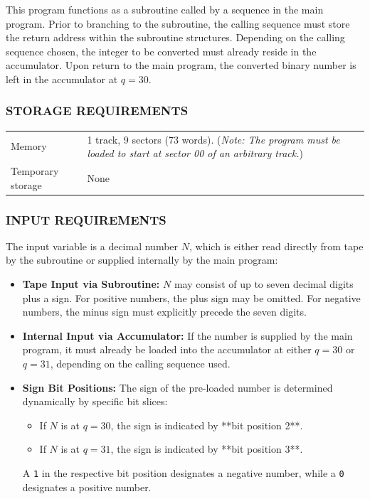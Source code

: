 This program functions as a subroutine called by a sequence in the main program. Prior to branching to the subroutine, the calling sequence must store the return address within the subroutine structures. Depending on the calling sequence chosen, the integer to be converted must already reside in the accumulator. Upon return to the main program, the converted binary number is left in the accumulator at $q=30$.

\subsubsection*{STORAGE REQUIREMENTS}
\begin{center}
\begin{tabularx}{\textwidth}{lX}
    \toprule
    Memory & 1 track, 9 sectors (73 words). \small(\textit{Note: The program must be loaded to start at sector 00 of an arbitrary track.}) \\
    Temporary storage    & None \\
    \bottomrule
\end{tabularx}
\end{center}

\subsubsection*{INPUT REQUIREMENTS}
The input variable is a decimal number $N$, which is either read directly from tape by the subroutine or supplied internally by the main program:

\begin{itemize}
    \item \textbf{Tape Input via Subroutine:} $N$ may consist of up to seven decimal digits plus a sign. For positive numbers, the plus sign may be omitted. For negative numbers, the minus sign must explicitly precede the seven digits.
    \item \textbf{Internal Input via Accumulator:} If the number is supplied by the main program, it must already be loaded into the accumulator at either $q=30$ or $q=31$, depending on the calling sequence used.
    \item \textbf{Sign Bit Positions:} The sign of the pre-loaded number is determined dynamically by specific bit slices:
    \begin{itemize}
        \item If $N$ is at $q=30$, the sign is indicated by **bit position 2**.
        \item If $N$ is at $q=31$, the sign is indicated by **bit position 3**.
    \end{itemize}
    A \texttt{1} in the respective bit position designates a negative number, while a \texttt{0} designates a positive number.
\end{itemize}

